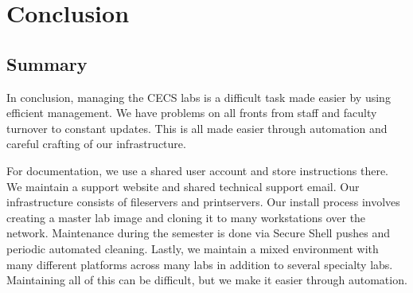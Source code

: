 \chapter{Conclusion} \label{ch:conclusion}
\section{Summary} \label{sec:summary}
In conclusion, managing the CECS labs is a difficult task made easier by using efficient management. We have problems on all fronts from staff and faculty turnover to constant updates. This is all made easier through automation and careful crafting of our infrastructure. 

For documentation, we use a shared user account and store instructions there.  We maintain a support website and shared technical support email.  Our infrastructure consists of fileservers and printservers.  Our install process involves creating a master lab image and cloning it to many workstations over the network.  Maintenance during the semester is done via Secure Shell pushes and periodic automated cleaning.  Lastly, we maintain a mixed environment with many different platforms across many labs in addition to several specialty labs.  Maintaining all of this can be difficult, but we make it easier through automation. 
